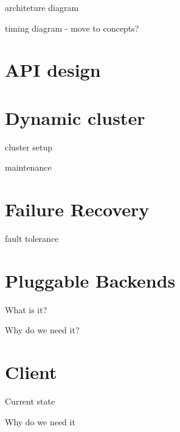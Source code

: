 {architeture diagram}

{timing diagram} - move to concepts?

\section{API design}

\section{Dynamic cluster}

cluster setup

maintenance

\section{Failure Recovery}

fault tolerance

\section{Pluggable Backends}

What is it?

Why do we need it?

\section{Client}

Current state

Why do we need it


